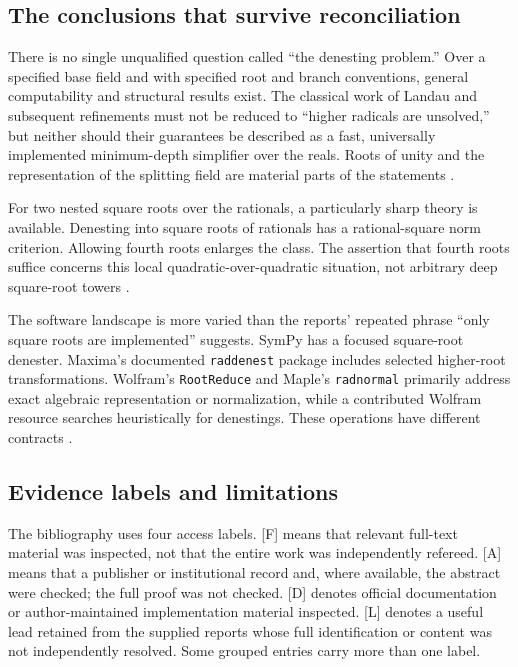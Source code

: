 \documentclass[11pt,oneside]{article}
\numberwithin{equation}{section}
\theoremstyle{definition}
\theoremstyle{remark}
\newcommand{\status}[1]{\textsf{\small[#1]}}
\begin{document}
\subsection{The conclusions that survive reconciliation}
There is no single unqualified question called ``the denesting problem.'' Over a specified base field and with specified root and branch conventions, general computability and structural results exist. The classical work of Landau and subsequent refinements must not be reduced to ``higher radicals are unsolved,'' but neither should their guarantees be described as a fast, universally implemented minimum-depth simplifier over the reals. Roots of unity and the representation of the splitting field are material parts of the statements \cite{landau,hornghuang,cotner,honsbeek}.

For two nested square roots over the rationals, a particularly sharp theory is available. Denesting into square roots of rationals has a rational-square norm criterion. Allowing fourth roots enlarges the class. The assertion that fourth roots suffice concerns this local quadratic-over-quadratic situation, not arbitrary deep square-root towers \cite{bfht,gkioulekas}.

The software landscape is more varied than the reports' repeated phrase ``only square roots are implemented'' suggests. SymPy has a focused square-root denester. Maxima's documented \texttt{raddenest} package includes selected higher-root transformations. Wolfram's \texttt{RootReduce} and Maple's \texttt{radnormal} primarily address exact algebraic representation or normalization, while a contributed Wolfram resource searches heuristically for denestings. These operations have different contracts \cite{sympy,maxima,wolframroot,wolframresource,maple}.

\subsection{Evidence labels and limitations}
The bibliography uses four access labels. \status{F} means that relevant full-text material was inspected, not that the entire work was independently refereed. \status{A} means that a publisher or institutional record and, where available, the abstract were checked; the full proof was not checked. \status{D} denotes official documentation or author-maintained implementation material inspected. \status{L} denotes a useful lead retained from the supplied reports whose full identification or content was not independently resolved. Some grouped entries carry more than one label.
\end{document}

